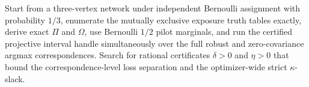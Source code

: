 Start from a three-vertex network under independent Bernoulli assignment with probability \(1/3\), enumerate the mutually exclusive exposure truth tables exactly, derive exact \(\Pi\) and \(\Omega\), use Bernoulli \(1/2\) pilot marginals, and run the certified projective interval handle simultaneously over the full robust and zero-covariance argmax correspondences. Search for rational certificates \(\delta>0\) and \(\eta>0\) that bound the correspondence-level loss separation and the optimizer-wide strict \(\kappa\)-slack.